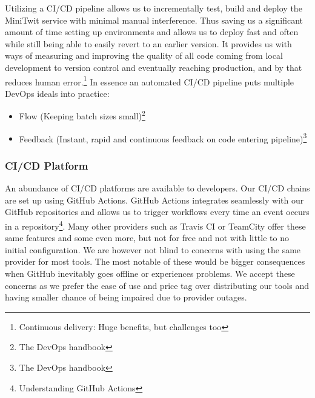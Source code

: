 Utilizing a CI/CD pipeline allows us to incrementally test, build and deploy the MiniTwit service with minimal manual interference. Thus saving us a significant amount of time setting up environments and allows us to deploy fast and often while still being able to easily revert to an earlier version.
It provides us with ways of measuring and improving the quality of all code coming from local development to version control and eventually reaching production, and by that reduces human error.\footnote{Continuous delivery: Huge benefits, but challenges too\cite{Chen2015}}
In essence an automated CI/CD pipeline puts multiple DevOps ideals into practice: 
\begin{itemize}
    \item Flow (Keeping batch sizes small)\footnote{\label{handbook}The DevOps handbook\cite{Kim2016}} 
    \item Feedback (Instant, rapid and continuous feedback on code entering pipeline)\footnote{The DevOps handbook\cite{Kim2016}}
\end{itemize}


\subsubsection{CI/CD Platform}
\label{subsubsec:cicdPlatform}
An abundance of CI/CD platforms are available to developers. Our CI/CD chains are set up using GitHub Actions. GitHub Actions integrates seamlessly with our GitHub repositories and allows us to trigger workflows every time an event occurs in a repository\footnote{Understanding GitHub Actions\cite{githubActions}}. Many other providers such as Travis CI\cite{travisCI} or TeamCity\cite{TeamCity} offer these same features and some even more, but not for free and not with little to no initial configuration. We are however not blind to concerns with using the same provider for most tools. The most notable of these would be bigger consequences when GitHub inevitably goes offline or experiences problems. We accept these concerns as we prefer the ease of use and price tag over distributing our tools and having smaller chance of being impaired due to provider outages.

